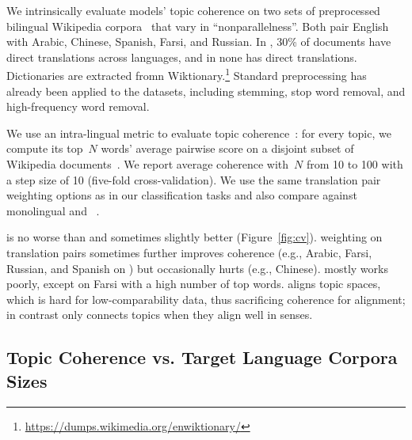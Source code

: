 We intrinsically evaluate models' topic coherence on two sets of
preprocessed bilingual Wikipedia corpora~\cite{hao-2018-mtm-doc-link}
that vary in ``nonparallelness''.
%
Both pair English with Arabic, Chinese, Spanish, Farsi, and Russian.
In \paco, 30\% of documents have direct translations across languages,
and in \inco none has direct translations. Dictionaries are extracted
fromn
Wiktionary.\footnote{\url{https://dumps.wikimedia.org/enwiktionary/}}
Standard preprocessing has already been applied to the datasets,
including stemming, stop word removal, and high-frequency word
removal.


We use an intra-lingual metric to evaluate topic
coherence~\cite{lau-2014-auto-word-intrusion}: for every topic, we
compute its top~$N$ words' average pairwise \pmi score
on a disjoint subset of Wikipedia
documents~\cite{hao-2018-mtm-doc-link}. We report average
coherence with~$N$ from 10 to 100 with a step size of 10 (five-fold
cross-validation). We use the same translation pair weighting options
as in our classification tasks and also compare against monolingual \lda
and \ptlda~\cite{Hu-2014-ptlda}.

\mtm is no worse than \lda and sometimes slightly
better (Figure~\ref{fig:cv}). \tfidf weighting on translation pairs
sometimes further improves coherence (e.g., Arabic, Farsi,
Russian, and Spanish on \inco) but occasionally hurts (e.g.,
Chinese). \ptlda mostly works poorly, except on Farsi with a high number
of top words. \ptlda aligns topic spaces, which is hard for
low-comparability data, thus sacrificing coherence
for alignment; in contrast \mtm only connects topics when they align well in senses.

\subsection{Topic Coherence vs. Target Language Corpora Sizes}
\label{subsec:topic_link_exp_target_ratio}

